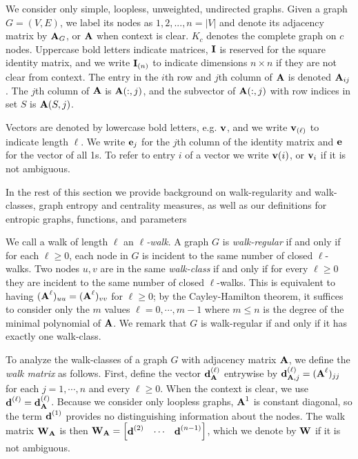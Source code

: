 We consider only simple, loopless, unweighted, undirected graphs.
Given a graph $G = (V,E)$, we label its nodes as $1, 2, ..., n = |V|$ and denote its adjacency matrix by $\textbf{A}_{G}$, or $\textbf{A}$ when context is clear.
$K_c$ denotes the complete graph on $c$ nodes.
Uppercase bold letters indicate matrices, $\textbf{I}$ is reserved for the square identity matrix, and
we write $\textbf{I}_{(n)}$ to indicate dimensions $n\times n$ if they are not clear from context.
The entry in the $i$th row and $j$th column of $\textbf{A}$ is denoted $\textbf{A}_{ij}$.
The $j$th column of $\textbf{A}$ is $\textbf{A}(:,j)$, and the subvector of $\textbf{A}(:,j)$
with row indices in set $S$ is $\textbf{A}(S,j)$.

Vectors are denoted by lowercase bold letters, e.g. $\textbf{v}$, and we write $\textbf{v}_{(\ell)}$ to indicate length $\ell$. We write $\textbf{e}_j$ for the $j$th column of the identity matrix and $\textbf{e}$ for the vector of all 1s. To refer to entry $i$ of a vector we write $\textbf{v}(i)$, or $\textbf{v}_i$ if it is not ambiguous.

In the rest of this section we provide background on walk-regularity and walk-classes, graph entropy and centrality measures, as well as our definitions for entropic graphs, functions, and parameters

We call a walk of length $\ell$ an \emph{$\ell$-walk}.
A graph $G$ is \emph{walk-regular} if and only if for each $\ell \geq 0$, each node in $G$ is incident to the same number of closed $\ell$-walks.
Two nodes $u, v$ are in the same \emph{walk-class}
if and only if for every $\ell \geq 0$ they are incident to the same number of closed $\ell$-walks.
This is equivalent to having $(\textbf{A}^\ell)_{uu} = (\textbf{A}^\ell)_{vv}$ for $\ell \geq 0$;
by the Cayley-Hamilton theorem, it suffices to consider only the $m$ values $\ell = 0, \cdots, m-1$ where $m\leq n$ is the degree of the minimal polynomial of $\textbf{A}$.
We remark that $G$ is walk-regular if and only if it has exactly one walk-class.

To analyze the walk-classes of a graph $G$ with adjacency matrix $\textbf{A}$, we define the \emph{walk matrix} as follows.
First, define the vector $\textbf{d}^{(\ell)}_{\textbf{A}}$ entrywise by $\textbf{d}^{(\ell)}_{\textbf{A},j} = (\textbf{A}^\ell)_{jj}$ for each $j=1,\cdots,n$ and every $\ell \geq 0$.
When the context is clear, we use $\textbf{d}^{(\ell)} = \textbf{d}^{(\ell)}_{\textbf{A}}$.
Because we consider only loopless graphs, $\textbf{A}^1$ is constant diagonal, so the term $\textbf{d}^{(1)}$ provides no distinguishing information about the nodes.
The walk matrix $\textbf{W}_{\textbf{A}}$ is then
$\textbf{W}_{\textbf{A}} = \begin{bmatrix}  \textbf{d}^{(2)} & \cdots & \textbf{d}^{(n-1)}  \end{bmatrix}$, which we denote by $\textbf{W}$ if it is not ambiguous.

